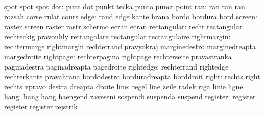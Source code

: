                            spot                      spot
                           spot
                      dot: punt                      dot
                           punkt                     tecka
                           punto                     punct
                           point
                      ran: ran                       ran
                           ran                       rozsah
                           corse                     rulat
                           cours
                     edge: rand                      edge
                           kante                     hrana
                           bordo                     bordura
                           bord
                   screen: raster                    screen
                           raster                    rastr
                           schermo                   ecran
                           ecran
              rectangular: recht                     rectangular
                           rechteckig                pravouhly
                           rettangolare              rectangular
                           rectangulaire
              rightmargin: rechtermarge              rightmargin
                           rechterrand               pravyokraj
                           marginedestro             marginedreapta
                           margedroite
                rightpage: rechterpagina             rightpage
                           rechterseite              pravastranka
                           paginadestra              paginadreapta
                           pagedroite
                rightedge: rechterrand               rightedge
                           rechterkante              pravahrana
                           bordodestro               borduradreapta
                           borddroit
                    right: rechts                    right
                           rechts                    vpravo
                           destra                    dreapta
                           droite
                     line: regel                     line
                           zeile                     radek
                           riga                      linie
                           ligne
                     hang: hang                      hang
                           haengend                  zaveseni
                           sospendi                  suspenda
                           suspend
                 register: register                  register
                           register                  rejstrik
